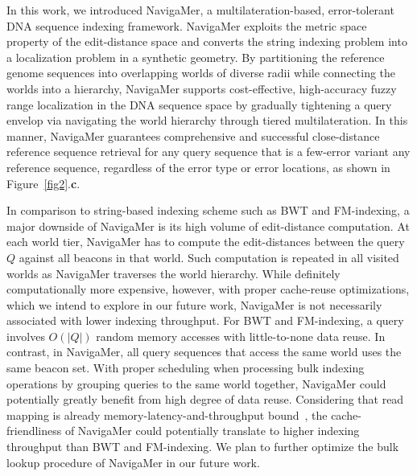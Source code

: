 \documentclass[unnumsec,webpdf,contemporary,large]{oup-authoring-template}%
\theoremstyle{thmstyleone}%
\theoremstyle{thmstyletwo}%
\theoremstyle{thmstylethree}%
\begin{document}

In this work, we introduced NavigaMer,
a multilateration-based, error-tolerant DNA sequence indexing framework.
NavigaMer exploits the metric space property of the edit-distance space and converts the string indexing problem into a localization problem in a synthetic geometry.
By partitioning the reference genome sequences into overlapping worlds of diverse radii while connecting the worlds into a hierarchy,
NavigaMer supports cost-effective, high-accuracy fuzzy range localization in the DNA sequence space by gradually tightening a query envelop via navigating the world hierarchy through tiered multilateration.
In this manner, NavigaMer guarantees comprehensive and successful close-distance reference sequence retrieval for any query sequence that is a few-error variant any reference sequence,
regardless of the error type or error locations, as shown in Figure~\ref{fig2}.\textbf{c}.

In comparison to string-based indexing scheme such as BWT and FM-indexing,
a major downside of NavigaMer is its high volume of edit-distance computation.
At each world tier, NavigaMer has to compute the edit-distances between the query $Q$ against all beacons in that world.
Such computation is repeated in all visited worlds as NavigaMer traverses the world hierarchy.
While definitely computationally more expensive,
however, with proper cache-reuse optimizations, which we intend to explore in our future work,
NavigaMer is not necessarily associated with lower indexing throughput.
For BWT and FM-indexing,
a query involves $O(|Q|)$ random memory accesses with little-to-none data reuse.
In contrast, in NavigaMer,
all query sequences that access the same world uses the same beacon set.
With proper scheduling when processing bulk indexing operations by grouping queries to the same world together,
NavigaMer could potentially greatly benefit from high degree of data reuse.
Considering that read mapping is already memory-latency-and-throughput bound~\citep{GenASM, onurframework},
the cache-friendliness of NavigaMer could potentially translate to higher indexing throughput than BWT and FM-indexing.
We plan to further optimize the bulk lookup procedure of NavigaMer in our future work.
\end{document}
